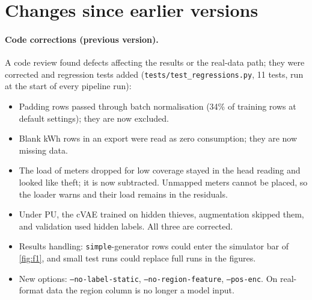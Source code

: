 \documentclass[11pt,a4paper]{article}
\theoremstyle{plain}
\theoremstyle{definition}
\theoremstyle{remark}
\begin{document}
\section{Changes since earlier versions}
\label{sec:changes}
\paragraph{Code corrections (previous version).} A code review found defects affecting the results or the real-data path; they were corrected and regression tests added (\texttt{tests/test\_regressions.py}, 11 tests, run at the start of every pipeline run):
\begin{itemize}
\item Padding rows passed through batch normalisation (34\% of training rows at default settings); they are now excluded.
\item Blank kWh rows in an export were read as zero consumption; they are now missing data.
\item The load of meters dropped for low coverage stayed in the head reading and looked like theft; it is now subtracted. Unmapped meters cannot be placed, so the loader warns and their load remains in the residuals.
\item Under PU, the cVAE trained on hidden thieves, augmentation skipped them, and validation used hidden labels. All three are corrected.
\item Results handling: \texttt{simple}-generator rows could enter the simulator bar of \cref{fig:f1}, and small test runs could replace full runs in the figures.
\item New options: \texttt{--no-label-static}, \texttt{--no-region-feature}, \texttt{--pos-enc}. On real-format data the region column is no longer a model input.
\end{itemize}
\end{document}
